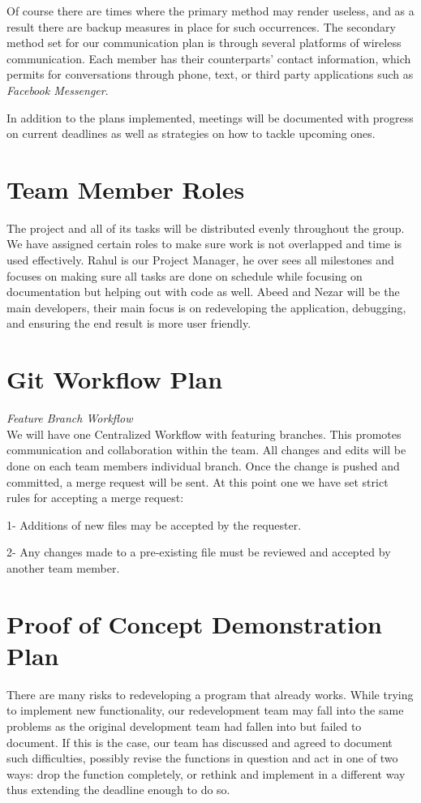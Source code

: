 \documentclass{article}
\begin{document}
Of course there are times where the primary method may render useless, and as a result there are backup measures in place for such occurrences. The secondary method set for our communication plan is through several platforms of wireless communication. Each member has their counterparts' contact information, which permits for conversations through phone, text, or third party applications such as \textit{Facebook Messenger}.

In addition to the plans implemented, meetings will be documented with progress on current deadlines as well as strategies on how to tackle upcoming ones.

\section{Team Member Roles}
The project and all of its tasks will be distributed evenly throughout the group. We have assigned certain roles to make sure work is not overlapped and time is used effectively. Rahul is our Project Manager, he over sees all milestones and focuses on making sure all tasks are done on schedule while focusing on documentation but helping out with code as well. Abeed and Nezar will be the main developers, their main focus is on redeveloping the application, debugging, and ensuring the end result is more user friendly.

\section{Git Workflow Plan}
\textit{Feature Branch Workflow\\}
We will have one Centralized Workflow with featuring branches. This promotes communication and collaboration within the team. All changes and edits will be done on each team members individual branch. Once the change is pushed and committed, a merge request will be sent. At this point one we have set strict rules for accepting a merge request: 

1- Additions of new files may be accepted by the requester.

2- Any changes made to a pre-existing file must be reviewed and accepted by another team member.

\section{Proof of Concept Demonstration Plan}
There are many risks to redeveloping a program that already works. While trying to implement new functionality, our redevelopment team may fall into the same problems as the original development team had fallen into but failed to document. If this is the case, our team has discussed and agreed to document such difficulties, possibly revise the functions in question and act in one of two ways: drop the function completely, or rethink and implement in a different way thus extending the deadline enough to do so.
\end{document}
